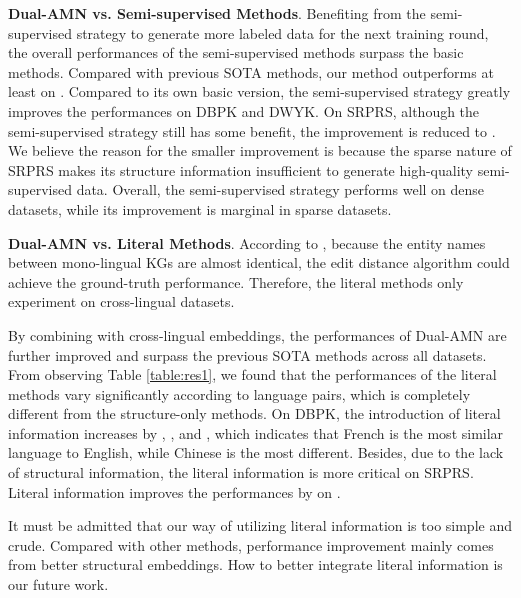 \documentclass[sigconf]{acmart}
\begin{document}
\noindent
\textbf{Dual-AMN vs. Semi-supervised Methods}.
Benefiting from the semi-supervised strategy to generate more labeled data for the next training round, the overall performances of the semi-supervised methods surpass the basic methods.
Compared with previous SOTA methods, our method outperforms at least  on .
Compared to its own basic version, the semi-supervised strategy greatly improves the performances on DBPK and DWYK.
On SRPRS, although the semi-supervised strategy still has some benefit, the improvement is reduced to .
We believe the reason for the smaller improvement is because the sparse nature of SRPRS makes its structure information insufficient to generate high-quality semi-supervised data.
Overall, the semi-supervised strategy performs well on dense datasets, while its improvement is marginal in sparse datasets.

\noindent
\textbf{Dual-AMN vs. Literal Methods}.
According to \citet{9174835}, because the entity names between mono-lingual KGs are almost identical, the edit distance algorithm could achieve the ground-truth performance.
Therefore, the literal methods only experiment on cross-lingual datasets.

By combining with cross-lingual embeddings, the performances of Dual-AMN are further improved and surpass the previous SOTA methods across all datasets.
From observing Table \ref{table:res1}, we found that the performances of the literal methods vary significantly according to language pairs, which is completely different from the structure-only methods.
On DBPK, the introduction of literal information increases  by , , and , which indicates that French is the most similar language to English, while Chinese is the most different.
Besides, due to the lack of structural information, the literal information is more critical on SRPRS.
Literal information improves the performances by  on .

It must be admitted that our way of utilizing literal information is too simple and crude.
Compared with other methods, performance improvement mainly comes from better structural embeddings.
How to better integrate literal information is our future work.
\end{document}
